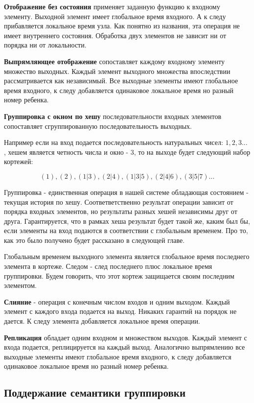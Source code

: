 \documentclass[14pt]{matmex-diploma-custom}
\begin{document}
\textbf{Отображение без состояния} применяет заданную функцию к входному элементу. Выходной элемент имеет глобальное время входного. А к следу прибавляется локальное время узла. Как понятно из названия, эта операция не имеет внутреннего состояния. Обработка двух элементов не зависит ни от порядка ни от локальности.

\textbf{Выпрямляющее отображение} сопоставляет каждому входному элементу множество выходных. Каждый элемент выходного множества впоследствии рассматривается как независимый. Все выходные элементы имеют глобальное время входного, к следу добавляется одинаковое локальное время но разный номер ребенка.


\textbf{Группировка с окном по хешу} последовательности входных элементов сопоставляет сгруппированную последовательность выходных.

Например если на вход подается последовательность натуральных чисел: \(1, 2, 3...\) , хешем является четность числа и окно - 3, то на выходе будет следующий набор кортежей:

\[(1), (2), (1|3), (2|4), (1|3|5), (2|4|6), (3|5|7)...\]

Группировка - единственная операция в нашей системе обладающая состоянием - текущая история по хешу. Соответветственно результат операции зависит от порядка входных элементов, но результаты разных хешей независимы друг от друга. Гарантируется, что в рамках хеша результат будет такой же, каким был бы, если элементы на вход подаются в соответствии с глобальным временем. Про то, как это было получено будет рассказано в следующей главе.

Глобальным временем выходного элемента является глобальное время последнего элемента в кортеже. Следом - след последнего плюс локальное время группировки. Будем говорить, что этот кортеж защищается своим последним элементом.

\textbf{Слияние} - операция с конечным числом входов и одним выходом. Каждый элемент с каждого входа подается на выход. Никаких гарантий на порядок не дается. К следу элемента добавляется локальное время операции.

\textbf{Репликация} обладает одним входном и множеством выходов.  Каждый элемент с входа подается, реплицируется на каждый выход. Аналогично выпрямлению все выходные элементы имеют глобальное время входного, к следу добавляется одинаковое локальное время но разный номер ребенка.

\subsection{Поддержание семантики группировки}
\end{document}

